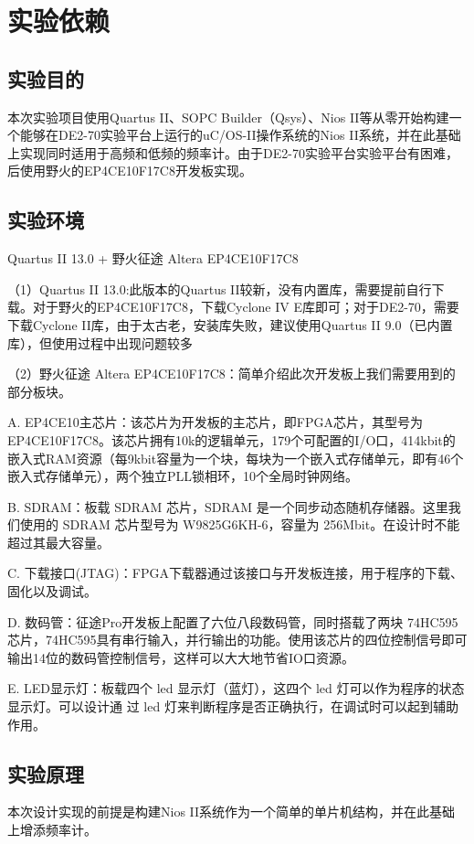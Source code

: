 \documentclass[AutoFakeBold]{LZUThesis}
\begin{document}
\mainmatter

\chapter{实验依赖}

\section{实验目的}
本次实验项目使用Quartus II、SOPC Builder（Qsys）、Nios II等从零开始构建一个能够在DE2-70实验平台上运行的uC/OS-II操作系统的Nios II系统，并在此基础上实现同时适用于高频和低频的频率计。由于DE2-70实验平台实验平台有困难，后使用野火的EP4CE10F17C8开发板实现。

\section{实验环境}
Quartus II 13.0 + 野火征途 Altera EP4CE10F17C8

（1）Quartus II 13.0:此版本的Quartus II较新，没有内置库，需要提前自行下载。对于野火的EP4CE10F17C8，下载Cyclone IV E库即可；对于DE2-70，需要下载Cyclone II库，由于太古老，安装库失败，建议使用Quartus II 9.0（已内置库），但使用过程中出现问题较多

（2）野火征途 Altera EP4CE10F17C8：简单介绍此次开发板上我们需要用到的部分板块。

A. EP4CE10主芯片：该芯片为开发板的主芯片，即FPGA芯片，其型号为 EP4CE10F17C8。该芯片拥有10k的逻辑单元，179个可配置的I/O口，414kbit的嵌入式RAM资源（每9kbit容量为一个块，每块为一个嵌入式存储单元，即有46个嵌入式存储单元），两个独立PLL锁相环，10个全局时钟网络。

B. SDRAM：板载 SDRAM 芯片，SDRAM 是一个同步动态随机存储器。这里我们使用的 SDRAM 芯片型号为 W9825G6KH-6，容量为 256Mbit。在设计时不能超过其最大容量。

C. 下载接口(JTAG)：FPGA下载器通过该接口与开发板连接，用于程序的下载、固化以及调试。

D. 数码管：征途Pro开发板上配置了六位八段数码管，同时搭载了两块 74HC595 芯片，74HC595具有串行输入，并行输出的功能。使用该芯片的四位控制信号即可输出14位的数码管控制信号，这样可以大大地节省IO口资源。

E. LED显示灯：板载四个 led 显示灯（蓝灯），这四个 led 灯可以作为程序的状态显示灯。可以设计通 过 led 灯来判断程序是否正确执行，在调试时可以起到辅助作用。
\section{实验原理}
本次设计实现的前提是构建Nios II系统作为一个简单的单片机结构，并在此基础上增添频率计。
\end{document}
